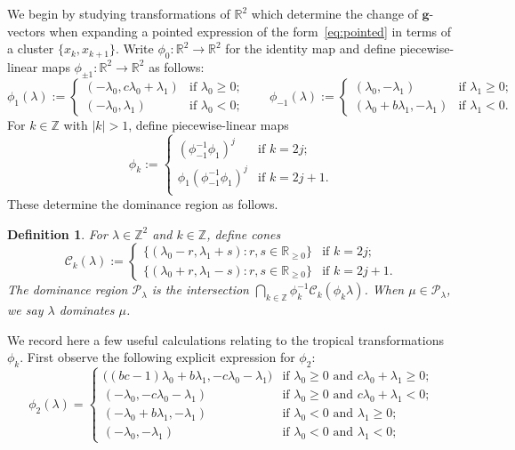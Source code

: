 \documentclass{amsart}
\newtheorem{definition}[theorem]{Definition}
\numberwithin{theorem}{section}
\newcommand{\bfg}{\boldsymbol{g}}
\newcommand{\cC}{\mathcal{C}}
\newcommand{\cP}{\mathcal{P}}
\newcommand{\RR}{\mathbb{R}}
\newcommand{\ZZ}{\mathbb{Z}}
\begin{document}
  We begin by studying transformations of $\RR^2$ which determine the change of $\bfg$-vectors when expanding a pointed expression of the form~\eqref{eq:pointed} in terms of a cluster $\{x_k,x_{k+1}\}$.
  Write $\phi_0:\RR^2\to\RR^2$ for the identity map and define piecewise-linear maps $\phi_{\pm 1}:\RR^2\to\RR^2$ as follows:
  \begin{equation}
    \label{eq:forward mutation 1}
    \phi_1(\lambda)
    :=
    \begin{cases} 
      (-\lambda_0,c\lambda_0+\lambda_1) & \text{if $\lambda_0 \ge 0$;}\\
      (-\lambda_0,\lambda_1) & \text{if $\lambda_0 < 0$;}
    \end{cases}
    \qquad
    \phi_{-1}(\lambda)
    :=
    \begin{cases} 
      (\lambda_0,-\lambda_1) & \text{if $\lambda_1 \ge 0$;}\\
      (\lambda_0+b\lambda_1,-\lambda_1) & \text{if $\lambda_1 < 0$.}
    \end{cases}
  \end{equation}
  For $k\in\ZZ$ with $|k|>1$, define piecewise-linear maps
  \[\phi_k
    :=
    \begin{cases}
      (\phi_{-1}^{-1}\phi_1)^j & \text{if $k=2j$;}\\
      \phi_1(\phi_{-1}^{-1}\phi_1)^j & \text{if $k=2j+1$.}\\
    \end{cases}
  \]
  These determine the dominance region as follows.
  \begin{definition}
    \label{def:dominance}
    For $\lambda\in\ZZ^2$ and $k\in\ZZ$, define cones 
    \[\cC_k(\lambda)
      :=
      \begin{cases}
        \{(\lambda_0-r,\lambda_1+s):r,s\in\RR_{\ge0}\} & \text{if $k=2j$;}\\
        \{(\lambda_0+r,\lambda_1-s):r,s\in\RR_{\ge0}\} & \text{if $k=2j+1$.}
      \end{cases}
    \]
    The \emph{dominance region} $\cP_\lambda$ is the intersection  $\bigcap_{k\in\ZZ}\phi_k^{-1}\cC_k(\phi_k\lambda)$.
    When $\mu\in\cP_\lambda$, we say \emph{$\lambda$ dominates $\mu$}.
  \end{definition}

  We record here a few useful calculations relating to the tropical transformations $\phi_k$.
  First observe the following explicit expression for $\phi_2$:
  \begin{equation}
    \label{eq:forward two step mutation}
    \phi_2(\lambda)
    =
    \begin{cases}
      \big((bc-1)\lambda_0+b\lambda_1, -c\lambda_0-\lambda_1\big) & \text{if $\lambda_0\ge 0$ and $c\lambda_0+\lambda_1\ge 0$;}\\
      (-\lambda_0, -c\lambda_0-\lambda_1) & \text{if $\lambda_0\ge 0$ and $c\lambda_0+\lambda_1<0$;}\\
      (-\lambda_0+b\lambda_1, -\lambda_1) & \text{if $\lambda_0<0$ and $\lambda_1\ge 0$;}\\
      (-\lambda_0,-\lambda_1) & \text{if $\lambda_0<0$ and $\lambda_1<0$;}
    \end{cases}
  \end{equation}
\end{document}
